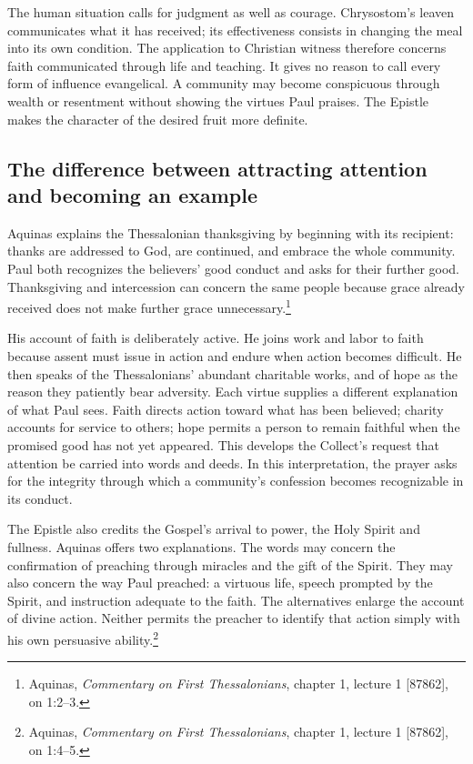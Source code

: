 The human situation calls for judgment as well as courage. Chrysostom's leaven communicates what it has received; its effectiveness consists in changing the meal into its own condition. The application to Christian witness therefore concerns faith communicated through life and teaching. It gives no reason to call every form of influence evangelical. A community may become conspicuous through wealth or resentment without showing the virtues Paul praises. The Epistle makes the character of the desired fruit more definite.

\subsection{The difference between attracting attention and becoming an example}

Aquinas explains the Thessalonian thanksgiving by beginning with its recipient: thanks are addressed to God, are continued, and embrace the whole community. Paul both recognizes the believers' good conduct and asks for their further good. Thanksgiving and intercession can concern the same people because grace already received does not make further grace unnecessary.\footnote{Aquinas, \textit{Commentary on First Thessalonians}, chapter 1, lecture 1 [87862], on 1:2--3.}

His account of faith is deliberately active. He joins work and labor to faith because assent must issue in action and endure when action becomes difficult. He then speaks of the Thessalonians' abundant charitable works, and of hope as the reason they patiently bear adversity. Each virtue supplies a different explanation of what Paul sees. Faith directs action toward what has been believed; charity accounts for service to others; hope permits a person to remain faithful when the promised good has not yet appeared. This develops the Collect's request that attention be carried into words and deeds. In this interpretation, the prayer asks for the integrity through which a community's confession becomes recognizable in its conduct.

The Epistle also credits the Gospel's arrival to power, the Holy Spirit and fullness. Aquinas offers two explanations. The words may concern the confirmation of preaching through miracles and the gift of the Spirit. They may also concern the way Paul preached: a virtuous life, speech prompted by the Spirit, and instruction adequate to the faith. The alternatives enlarge the account of divine action. Neither permits the preacher to identify that action simply with his own persuasive ability.\footnote{Aquinas, \textit{Commentary on First Thessalonians}, chapter 1, lecture 1 [87862], on 1:4--5.}

